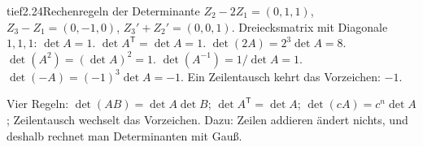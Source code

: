 \begin{loesungkarte}{tief}{2.24}{Rechenregeln der Determinante}
$Z_2 - 2Z_1 = (0, 1, 1)$, $Z_3 - Z_1 = (0, -1, 0)$, $Z_3' + Z_2' = (0, 0, 1)$. Dreiecksmatrix mit Diagonale $1, 1, 1$: $\det A = 1$.
$\det A^{\mathsf T} = \det A = 1$. $\det(2A) = 2^{3}\det A = 8$. $\det(A^{2}) = (\det A)^{2} = 1$. $\det(A^{-1}) = 1/\det A = 1$. $\det(-A) = (-1)^{3}\det A = -1$.
Ein Zeilentausch kehrt das Vorzeichen: $-1$.
\begin{mitnehmen}\kastentext
Vier Regeln: $\det(AB) = \det A\det B$; $\det A^{\mathsf T} = \det A$; $\det(cA) = c^{n}\det A$; Zeilentausch wechselt das Vorzeichen. Dazu: Zeilen addieren ändert nichts, und deshalb rechnet man Determinanten mit Gauß.
\end{mitnehmen}
\end{loesungkarte}

